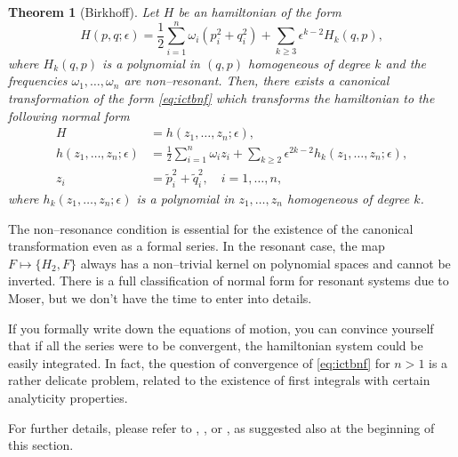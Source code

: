 \documentclass[english,fontsize=11pt,paper=a5,oneside]{scrbook}
\newtheorem{theorem}{Theorem}[chapter]
\theoremstyle{definition}
\begin{document}
\begin{theorem}[Birkhoff]
  Let $H$ be an hamiltonian of the form
  \begin{equation}
    H(p,q; \epsilon) = \frac12 \sum_{i=1}^n \omega_i(p_i^2 + q_i^2) + \sum_{k\geq 3} \epsilon^{k-2} H_k(q,p),
  \end{equation}
  where $H_k(q,p)$ is a polynomial in $(q,p)$ homogeneous of degree $k$ and the frequencies $\omega_1,\ldots,\omega_n$ are non--resonant.
  Then, there exists a canonical transformation of the form \eqref{eq:ictbnf} which transforms the hamiltonian to the following normal form
  \begin{align}
    H                          & = h(z_1, \ldots, z_n; \epsilon),                                                                      \\
    h(z_1,\ldots,z_n;\epsilon) & = \frac12 \sum_{i=1}^n \omega_i z_i + \sum_{k\geq 2} \epsilon^{2k-2} h_k(z_1, \ldots, z_n; \epsilon), \\
    z_i                        & = \widetilde p_i^2 + \widetilde q_i^2,\quad i=1,\ldots,n,
  \end{align}
  where $h_k(z_1, \ldots, z_n; \epsilon)$ is a polynomial in $z_1, \ldots, z_n$ homogeneous of degree $k$.
\end{theorem}

The non--resonance condition is essential for the existence of the canonical transformation even as a formal series. In the resonant case, the map $F \mapsto \big\{H_2, F\big\}$ always has a non--trivial kernel on polynomial spaces and cannot be inverted.
There is a full classification of normal form for resonant systems due to Moser, but we don't have the time to enter into details.

If you formally write down the equations of motion, you can convince yourself that if all the series were to be convergent, the hamiltonian system could be easily integrated.
In fact, the question of convergence of \eqref{eq:ictbnf} for $n>1$ is a rather delicate problem, related to the existence of first integrals with certain analyticity properties.

For further details, please refer to \cite{Broer_2009}, \cite[Chapter 6.5]{book:celletti}, \cite[Chapter 8.3]{book:arnoldcelestial} or \cite[Chapters 15.2 and 15.3]{book:knauf}, as suggested also at the beginning of this section.

\end{document}
